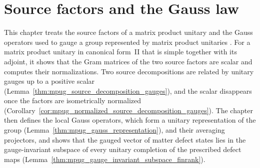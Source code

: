\chapter{Source factors and the Gauss law}
\label{ch:mpu_cocycles_gauss_law}

This chapter treats the source factors of a matrix product unitary and the
Gauss operators used to gauge a group represented by matrix product unitaries
\cite{FrancoRubio2025MPUGauging}. For a matrix product unitary in canonical
form~II that is simple together with its adjoint, it shows that the Gram
matrices of the two source factors are scalar and computes their
normalizations. Two source decompositions are related by unitary gauges up to
a positive scalar (Lemma~\ref{thm:mpug_source_decomposition_gauges}), and the
scalar disappears once the factors are isometrically normalized
(Corollary~\ref{cor:mpug_normalized_source_decomposition_gauges}). The chapter
then defines the local Gauss operators, which form a unitary representation
of the group (Lemma~\ref{thm:mpug_gauss_representation}), and their averaging
projectors, and shows that the gauged vector of matter defect states lies in
the gauge-invariant subspace of every unitary completion of the prescribed
defect maps (Lemma~\ref{thm:mpug_gauge_invariant_subspace_finrank}).


